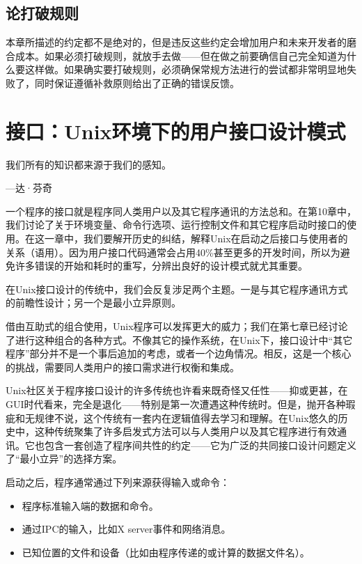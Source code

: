 \documentclass[12pt,oneside]{book}
\begin{document}
\section{论打破规则}
本章所描述的约定都不是绝对的，但是违反这些约定会增加用户和未来开发者的磨合成本。如果必须打破规则，就放手去做——但在做之前要确信自己完全知道为什么要这样做。如果确实要打破规则，必须确保常规方法进行的尝试都非常明显地失败了，同时保证遵循补救原则给出了正确的错误反馈。




\chapter{接口：Unix环境下的用户接口设计模式}
\begin{flushright}
我们所有的知识都来源于我们的感知。

{\hfill —达·芬奇}
\end{flushright}

一个程序的接口就是程序同人类用户以及其它程序通讯的方法总和。在第10章中，我们讨论了关于环境变量、命令行选项、运行控制文件和其它程序启动时接口的使用。在这一章中，我们要解开历史的纠结，解释Unix在启动之后接口与使用者的关系（语用）。因为用户接口代码通常会占用40\%{}甚至更多的开发时间，所以为避免许多错误的开始和耗时的重写，分辨出良好的设计模式就尤其重要。

在Unix接口设计的传统中，我们会反复涉足两个主题。一是与其它程序通讯方式的前瞻性设计；另一个是最小立异原则。

借由互助式的组合使用，Unix程序可以发挥更大的威力；我们在第七章已经讨论了进行这种组合的各种方式。不像其它的操作系统，在Unix下，接口设计中“其它程序”部分并不是一个事后追加的考虑，或者一个边角情况。相反，这是一个核心的挑战，需要同人类用户的接口需求进行权衡和集成。

Unix社区关于程序接口设计的许多传统也许看来既奇怪又任性——抑或更甚，在GUI时代看来，完全是退化——特别是第一次遭遇这种传统时。但是，抛开各种瑕疵和无规律不说，这个传统有一套内在逻辑值得去学习和理解。在Unix悠久的历史中，这种传统聚集了许多启发式方法可以与人类用户以及其它程序进行有效通讯。它也包含一套创造了程序间共性的约定——它为广泛的共同接口设计问题定义了“最小立异”的选择方案。

启动之后，程序通常通过下列来源获得输入或命令：
\begin{itemize}
\item 程序标准输入端的数据和命令。
\item 通过IPC的输入，比如X server事件和网络消息。
\item 已知位置的文件和设备（比如由程序传递的或计算的数据文件名）。
\end{itemize}
\end{document}
